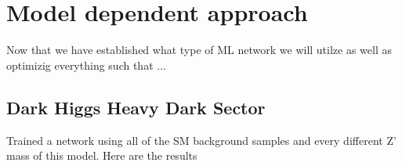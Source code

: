 \documentclass[12pt, a4paper]{book}
\begin{document}
\label{chap:Best_ML}
\chapter{Model dependent approach}
Now that we have established what type of ML network we will utilze as well as optimizig everything such that ... 


\graphicspath{{../../../Plots/}}
\section{Dark Higgs Heavy Dark Sector}
Trained a network using all of the SM background samples and every different Z' mass of this model. Here are the results
\end{document}
